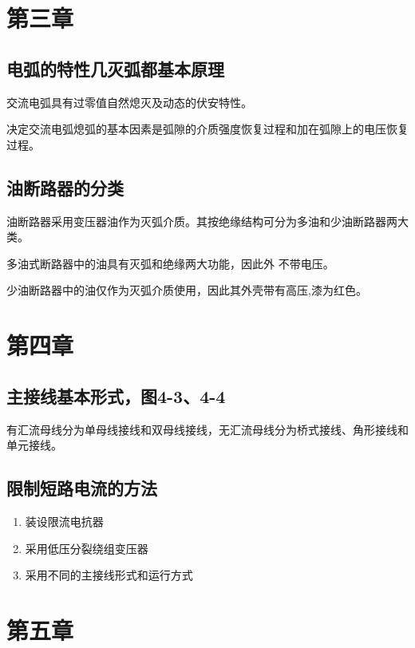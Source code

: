 \documentclass[UTF8]{ctexart}
\begin{document}
\section{第三章}
\subsection{电弧的特性几灭弧都基本原理}
\par 交流电弧具有过零值自然熄灭及动态的伏安特性。
\par 决定交流电弧熄弧的基本因素是弧隙的介质强度恢复过程和加在弧隙上的电压恢复过程。
\subsection{油断路器的分类}
\par 油断路器采用变压器油作为灭弧介质。其按绝缘结构可分为多油和少油断路器两大类。
\par \quad 多油式断路器中的油具有灭弧和绝缘两大功能，因此外 不带电压。
\par \quad 少油断路器中的油仅作为灭弧介质使用，因此其外壳带有高压,漆为红色。
\section{第四章}
\subsection{主接线基本形式，图4-3、4-4}
\par 有汇流母线分为单母线接线和双母线接线，无汇流母线分为桥式接线、角形接线和单元接线。
\subsection{限制短路电流的方法}
\begin{enumerate}[(1)]
\item 装设限流电抗器
\item 采用低压分裂绕组变压器
\item 采用不同的主接线形式和运行方式    
\end{enumerate}
\section{第五章}
\end{document}
